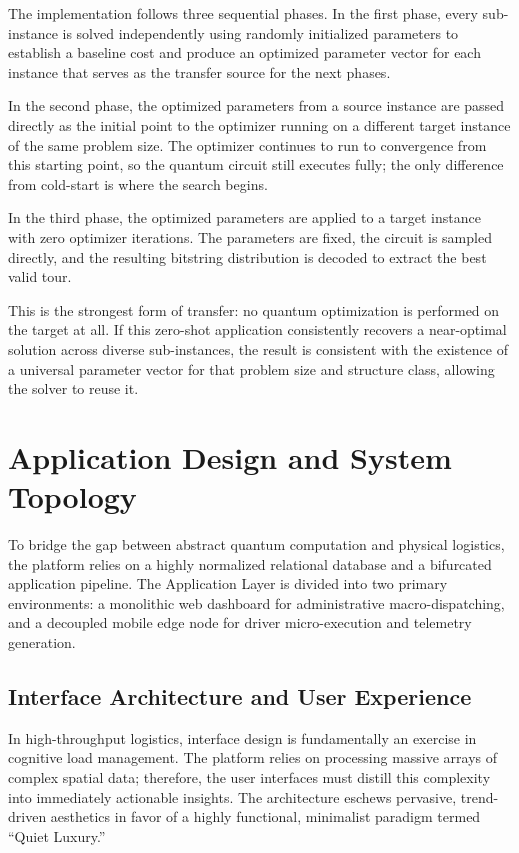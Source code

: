 \documentclass[a4paper]{report}
\begin{document}
{\begin{itemize}
\begin{itemize}
The implementation follows three sequential phases. In the first phase, every sub-instance is solved independently using randomly initialized parameters to establish a baseline cost and produce an optimized parameter vector for each instance that serves as the transfer source for the next phases.

In the second phase, the optimized parameters from a source instance are passed directly as the initial point to the optimizer running on a different target instance of the same problem size. The optimizer continues to run to convergence from this starting point, so the quantum circuit still executes fully; the only difference from cold-start is where the search begins.

In the third phase, the optimized parameters are applied to a target instance with zero optimizer iterations. The parameters are fixed, the circuit is sampled directly, and the resulting bitstring distribution is decoded to extract the best valid tour. 

This is the strongest form of transfer: no quantum optimization is performed on the target at all. If this zero-shot application consistently recovers a near-optimal solution across diverse sub-instances, the result is consistent with the existence of a universal parameter vector for that problem size and structure class, allowing the solver to reuse it.

\section{Application Design and System Topology}
\label{sec:application-design}

To bridge the gap between abstract quantum computation and physical logistics, the platform relies on a highly normalized relational database and a bifurcated application pipeline. The Application Layer is divided into two primary environments: a monolithic web dashboard for administrative macro-dispatching, and a decoupled mobile edge node for driver micro-execution and telemetry generation.

\subsection{Interface Architecture and User Experience}
\label{sec:app-ux}

In high-throughput logistics, interface design is fundamentally an exercise in cognitive load management. The platform relies on processing massive arrays of complex spatial data; therefore, the user interfaces must distill this complexity into immediately actionable insights. The architecture eschews pervasive, trend-driven aesthetics in favor of a highly functional, minimalist paradigm termed ``Quiet Luxury.''


\end{itemize}
\end{itemize}}
\end{document}
